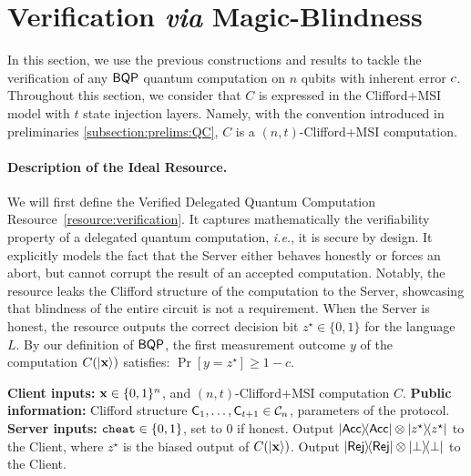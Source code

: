 \section{Verification \emph{via} Magic-Blindness}
\label{section:verification}
In this section, we use the previous constructions and results to tackle the verification of any $\textsf{BQP}$ quantum computation on $n$ qubits with inherent error $c$.
Throughout this section, we consider that $C$ is expressed in the Clifford+MSI model with $t$ state injection layers. Namely, with the convention introduced in preliminaries \ref{subsection:prelims:QC}, $C$ is a $(n,t)$-Clifford+MSI computation.
\paragraph{Description of the Ideal Resource.}
We will first define the Verified Delegated Quantum Computation Resource~\ref{resource:verification}. It captures mathematically the verifiability property of a delegated quantum computation, \emph{i.e.}, it is secure by design. It explicitly models the fact that the Server either behaves honestly or forces an abort, but cannot corrupt the result of an accepted computation.
Notably, the resource leaks the Clifford structure of the computation to the Server, showcasing that blindness of the entire circuit is not a requirement. When the Server is honest, the resource outputs the correct decision bit $z^\star \in \{0,1\}$ for the language $L$.
By our definition of $\textsf{BQP}$, the first measurement outcome $y$ of the computation $C(\ket{\mathbf x})$ satisfies:
\(
\Pr[y = z^\star] \ge 1 - c .
\)

\begin{resourcee}
    \caption{Verified Delegated Quantum Computation}
    \label{resource:verification}
    \begin{algorithmic}[0]
        \State \textbf{Client inputs:} $\mathbf x \in \{0,1\}^n$, and $(n,t)$-Clifford+MSI computation $C$.
    \State \textbf{Public information:} Clifford structure $\mathsf{C}_{1}, \dots, \mathsf{C}_{t+1} \in \mathcal{C}_n$, parameters of the protocol.
    \State \textbf{Server inputs:} $\mathtt{cheat} \in \{0,1\}$, set to $0$ if honest.
            \State Output $\ketbra{\mathsf{Acc}} \otimes \ketbra{z^\star}$ to the Client, where $z^\star$ is the biased output of $C(\ket{\mathbf x})$.
        \Else
            \State Output $\ketbra{\mathsf{Rej}} \otimes \ketbra{\perp}$ to the Client.
        \EndIf
    \EndProcedure
    \end{algorithmic}
\end{resourcee}
